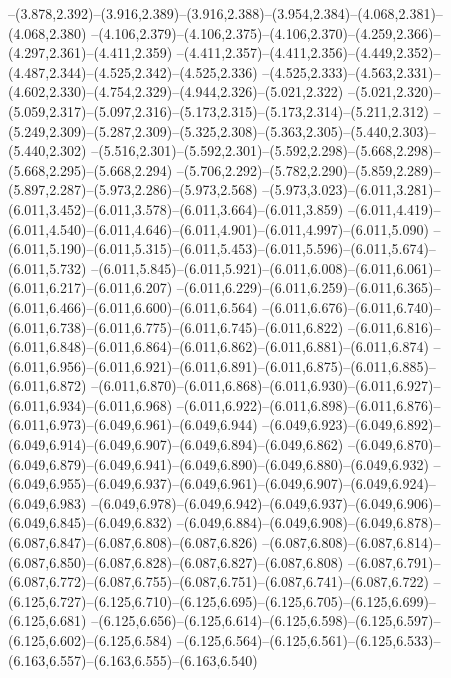   --(3.878,2.392)--(3.916,2.389)--(3.916,2.388)--(3.954,2.384)--(4.068,2.381)--(4.068,2.380)%
  --(4.106,2.379)--(4.106,2.375)--(4.106,2.370)--(4.259,2.366)--(4.297,2.361)--(4.411,2.359)%
  --(4.411,2.357)--(4.411,2.356)--(4.449,2.352)--(4.487,2.344)--(4.525,2.342)--(4.525,2.336)%
  --(4.525,2.333)--(4.563,2.331)--(4.602,2.330)--(4.754,2.329)--(4.944,2.326)--(5.021,2.322)%
  --(5.021,2.320)--(5.059,2.317)--(5.097,2.316)--(5.173,2.315)--(5.173,2.314)--(5.211,2.312)%
  --(5.249,2.309)--(5.287,2.309)--(5.325,2.308)--(5.363,2.305)--(5.440,2.303)--(5.440,2.302)%
  --(5.516,2.301)--(5.592,2.301)--(5.592,2.298)--(5.668,2.298)--(5.668,2.295)--(5.668,2.294)%
  --(5.706,2.292)--(5.782,2.290)--(5.859,2.289)--(5.897,2.287)--(5.973,2.286)--(5.973,2.568)%
  --(5.973,3.023)--(6.011,3.281)--(6.011,3.452)--(6.011,3.578)--(6.011,3.664)--(6.011,3.859)%
  --(6.011,4.419)--(6.011,4.540)--(6.011,4.646)--(6.011,4.901)--(6.011,4.997)--(6.011,5.090)%
  --(6.011,5.190)--(6.011,5.315)--(6.011,5.453)--(6.011,5.596)--(6.011,5.674)--(6.011,5.732)%
  --(6.011,5.845)--(6.011,5.921)--(6.011,6.008)--(6.011,6.061)--(6.011,6.217)--(6.011,6.207)%
  --(6.011,6.229)--(6.011,6.259)--(6.011,6.365)--(6.011,6.466)--(6.011,6.600)--(6.011,6.564)%
  --(6.011,6.676)--(6.011,6.740)--(6.011,6.738)--(6.011,6.775)--(6.011,6.745)--(6.011,6.822)%
  --(6.011,6.816)--(6.011,6.848)--(6.011,6.864)--(6.011,6.862)--(6.011,6.881)--(6.011,6.874)%
  --(6.011,6.956)--(6.011,6.921)--(6.011,6.891)--(6.011,6.875)--(6.011,6.885)--(6.011,6.872)%
  --(6.011,6.870)--(6.011,6.868)--(6.011,6.930)--(6.011,6.927)--(6.011,6.934)--(6.011,6.968)%
  --(6.011,6.922)--(6.011,6.898)--(6.011,6.876)--(6.011,6.973)--(6.049,6.961)--(6.049,6.944)%
  --(6.049,6.923)--(6.049,6.892)--(6.049,6.914)--(6.049,6.907)--(6.049,6.894)--(6.049,6.862)%
  --(6.049,6.870)--(6.049,6.879)--(6.049,6.941)--(6.049,6.890)--(6.049,6.880)--(6.049,6.932)%
  --(6.049,6.955)--(6.049,6.937)--(6.049,6.961)--(6.049,6.907)--(6.049,6.924)--(6.049,6.983)%
  --(6.049,6.978)--(6.049,6.942)--(6.049,6.937)--(6.049,6.906)--(6.049,6.845)--(6.049,6.832)%
  --(6.049,6.884)--(6.049,6.908)--(6.049,6.878)--(6.087,6.847)--(6.087,6.808)--(6.087,6.826)%
  --(6.087,6.808)--(6.087,6.814)--(6.087,6.850)--(6.087,6.828)--(6.087,6.827)--(6.087,6.808)%
  --(6.087,6.791)--(6.087,6.772)--(6.087,6.755)--(6.087,6.751)--(6.087,6.741)--(6.087,6.722)%
  --(6.125,6.727)--(6.125,6.710)--(6.125,6.695)--(6.125,6.705)--(6.125,6.699)--(6.125,6.681)%
  --(6.125,6.656)--(6.125,6.614)--(6.125,6.598)--(6.125,6.597)--(6.125,6.602)--(6.125,6.584)%
  --(6.125,6.564)--(6.125,6.561)--(6.125,6.533)--(6.163,6.557)--(6.163,6.555)--(6.163,6.540)%
